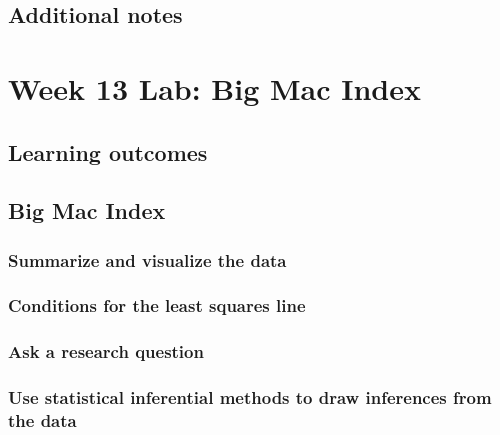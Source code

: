 \documentclass[
]{report}
\begin{document}
\hypertarget{additional-notes-20}{%
\subsection{Additional notes}\label{additional-notes-20}}

\hypertarget{week-13-lab-big-mac-index}{%
\section{Week 13 Lab: Big Mac Index}\label{week-13-lab-big-mac-index}}

\hypertarget{learning-outcomes-27}{%
\subsection{Learning outcomes}\label{learning-outcomes-27}}

\hypertarget{big-mac-index}{%
\subsection{Big Mac Index}\label{big-mac-index}}

\hypertarget{summarize-and-visualize-the-data-7}{%
\subsubsection*{Summarize and visualize the data}\label{summarize-and-visualize-the-data-7}}

\hypertarget{conditions-for-the-least-squares-line-1}{%
\subsubsection*{Conditions for the least squares line}\label{conditions-for-the-least-squares-line-1}}

\hypertarget{ask-a-research-question-7}{%
\subsubsection*{Ask a research question}\label{ask-a-research-question-7}}

\hypertarget{use-statistical-inferential-methods-to-draw-inferences-from-the-data-7}{%
\subsubsection*{Use statistical inferential methods to draw inferences from the data}\label{use-statistical-inferential-methods-to-draw-inferences-from-the-data-7}}
\end{document}
